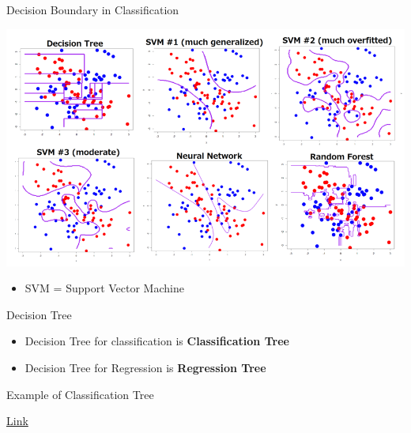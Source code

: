 \documentclass[
  ignorenonframetext,
]{beamer}
\providecommand{\tightlist}{%
  \setlength{\itemsep}{0pt}\setlength{\parskip}{0pt}}
\begin{document}
\begin{frame}{Decision Boundary in Classification}
\protect\hypertarget{decision-boundary-in-classification-2}{}

\includegraphics{images2/db1.png}

\begin{itemize}
\tightlist
\item
  SVM = Support Vector Machine
\end{itemize}

\end{frame}

\begin{frame}{Decision Tree}
\protect\hypertarget{decision-tree}{}

\begin{itemize}
\tightlist
\item
  Decision Tree for classification is \textbf{Classification Tree}
\item
  Decision Tree for Regression is \textbf{Regression Tree}
\end{itemize}

\end{frame}

\begin{frame}{Example of Classification Tree}
\protect\hypertarget{example-of-classification-tree}{}

\href{http://graphics8.nytimes.com/images/2008/04/16/us/0416-nat-subOBAMA.jpg}{Link}

\end{frame}
\end{document}
